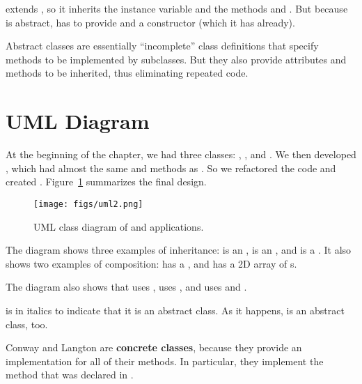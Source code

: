 extends , so it inherits the  instance variable  and the methods  and .
But because  is abstract,  has to provide  and a constructor (which it has already).

Abstract classes are essentially ``incomplete'' class definitions that specify methods to be implemented by subclasses.
But they also provide attributes and methods to be inherited, thus eliminating repeated code.


\section{UML Diagram}
\label{reusing-classes_uml-diagram}

At the beginning of the chapter, we had three classes: , , and .
We then developed , which had almost the same  and  methods as .
So we refactored the code and created .
Figure~\ref{fig:uml2} summarizes the final design.

\begin{figure}[!ht]
\begin{center}
\texttt{[image: figs/uml2.png]}
\caption{UML class diagram of  and  applications.}
\label{fig:uml2}
\end{center}
\end{figure}


The diagram shows three examples of inheritance:  is an ,  is an , and  is a .
It also shows two examples of composition:  has a , and  has a 2D array of s.

The diagram also shows that  uses ,  uses , and  uses  and .

 is in italics to indicate that it is an abstract class.
As it happens,  is an abstract class, too.


Conway and Langton are {\bf concrete classes}, because they provide an implementation for all of their methods.
In particular, they implement the  method that was declared  in .


